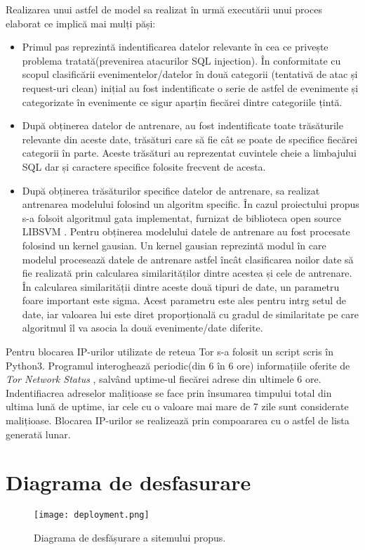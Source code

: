 Realizarea unui astfel de model sa realizat în urmă executării unui proces elaborat ce implică mai mulți păși: 
\begin{itemize}
	 \item  Primul pas reprezintă indentificarea datelor relevante în cea ce privește problema tratată(prevenirea atacurilor SQL injection). În conformitate cu scopul clasificării evenimentelor/datelor în două categorii (tentativă de atac și request-uri clean) inițial au fost  indentificate o serie de astfel de evenimente și categorizate în evenimente ce sigur aparțin fiecărei dintre categoriile țintă.  
	\item După  obținerea datelor de antrenare, au fost indentificate toate trăsăturile relevante din aceste date, trăsături care să fie cât se poate de specifice fiecărei categorii în parte. Aceste trăsături au reprezentat cuvintele cheie a limbajului SQL dar și caractere specifice folosite frecvent de acesta. 
	\item După obținerea trăsăturilor specifice datelor de antrenare, sa realizat antrenarea modelului folosind un algoritm specific. În cazul proiectului propus s-a folsoit algoritmul gata implementat, furnizat de biblioteca open source LIBSVM \cite{libsvm}. Pentru obținerea modelului datele de antrenare au fost procesate folosind un kernel gausian. Un kernel gausian reprezintă modul în care modelul procesează datele de antrenare astfel încât clasificarea noilor date să fie realizată prin calcularea similarităților dintre acestea și cele de antrenare. În calcularea similarității dintre aceste două tipuri de date, un parametru foare important este sigma. Acest parametru este ales pentru intrg setul de date, iar valoarea lui este diret proporțională cu gradul de similaritate pe care algoritmul îl va asocia la două evenimente/date diferite. 
\end{itemize}

Pentru blocarea IP-urilor utilizate de reteua Tor s-a folosit un script scris în Python3. Programul interoghează periodic(din 6 în 6 ore) informațiile oferite de \textit{Tor Network Status} \cite{tot_status}, salvând uptime-ul fiecărei adrese din ultimele 6 ore. Indentifiacrea adreselor malițioase se face prin însumarea timpului total din ultima lună de uptime, iar cele cu o valoare mai mare de 7 zile sunt considerate malițioase. Blocarea IP-urilor se realizează prin compoararea cu o astfel de lista generată lunar. 

\section{Diagrama de desfasurare}
\begin{figure}[h]
	\centering
	\texttt{[image: deployment.png]}
	\caption{ Diagrama de desfășurare a sitemului propus. }
	\label{fig:deployment}
\end{figure}

